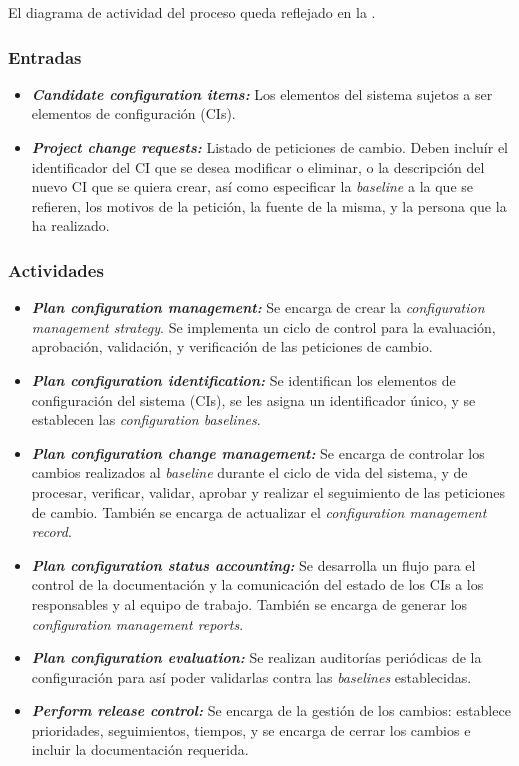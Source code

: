El diagrama de actividad del proceso queda reflejado en la .



\subsubsection{Entradas}
\begin{itemize}
  \item \textbf{\textit{Candidate configuration items:}} Los elementos del sistema sujetos a ser elementos de configuración (CIs).
  \item \textbf{\textit{Project change requests:}} Listado de peticiones de cambio. Deben incluír el identificador del CI que se desea modificar o eliminar, o la descripción del nuevo CI que se quiera crear, así como especificar la \textit{baseline} a la que se refieren, los motivos de la petición, la fuente de la misma, y la persona que la ha realizado.
\end{itemize}

\subsubsection{Actividades}
\begin{itemize}
  \item \textbf{\textit{Plan configuration management:}} Se encarga de crear la \textit{configuration management strategy}. Se implementa un ciclo de control para la evaluación, aprobación, validación, y verificación de las peticiones de cambio.
  \item \textbf{\textit{Plan configuration identification:}} Se identifican los elementos de configuración del sistema (CIs), se les asigna un identificador único, y se establecen las \textit{configuration baselines}.
  \item \textbf{\textit{Plan configuration change management:}} Se encarga de controlar los cambios realizados al \textit{baseline} durante el ciclo de vida del sistema, y de procesar, verificar, validar, aprobar y realizar el seguimiento de las peticiones de cambio. También se encarga de actualizar el \textit{configuration management record}.
  \item \textbf{\textit{Plan configuration status accounting:}} Se desarrolla un flujo para el control de la documentación y la comunicación del estado de los CIs a los responsables y al equipo de trabajo. También se encarga de generar los \textit{configuration management reports}.
  \item \textbf{\textit{Plan configuration evaluation:}} Se realizan auditorías periódicas de la configuración para así poder validarlas contra las \textit{baselines} establecidas.
  \item \textbf{\textit{Perform release control:}} Se encarga de la gestión de los cambios: establece prioridades, seguimientos, tiempos, y se encarga de cerrar los cambios e incluir la documentación requerida.
\end{itemize}


